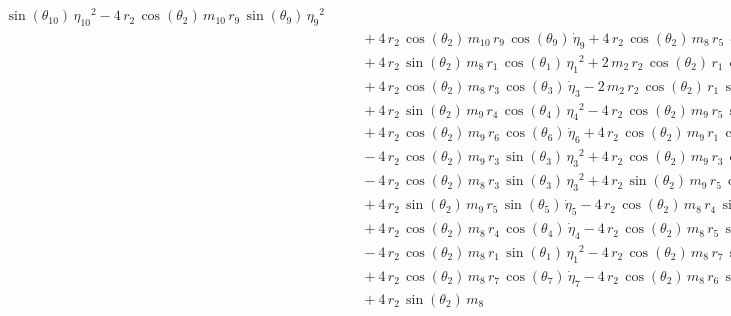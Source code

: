 \begin{eqnarray*}
\sin({\theta_{10}})\,{{\eta_{10}}}^2 - 4\,r_{2}\,\cos({\theta_{2}})\,m
_{10}\,r_{9}\,\sin({\theta_{9}})\,{{\eta_{9}}}^2 \\ &&\quad\mbox{} + 4
\,r_{2}\,\cos({\theta_{2}})\,m_{10}\,r_{9}\,\cos({\theta_{9}})\,{
\dot{\eta}_{9}} + 4\,r_{2}\,\cos({\theta_{2}})\,m_{8}\,r_{5}\,\cos({
\theta_{5}})\,{\dot{\eta}_{5}} \\ &&\quad\mbox{} + 4\,r_{2}\,\sin({
\theta_{2}})\,m_{8}\,r_{1}\,\cos({\theta_{1}})\,{{\eta_{1}}}^2 + 2\,m
_{2}\,r_{2}\,\cos({\theta_{2}})\,r_{1}\,\cos({\theta_{1}})\,{
\dot{\eta}_{1}} \\ &&\quad\mbox{} + 4\,r_{2}\,\cos({\theta_{2}})\,m_{8
}\,r_{3}\,\cos({\theta_{3}})\,{\dot{\eta}_{3}} - 2\,m_{2}\,r_{2}\,\cos
({\theta_{2}})\,r_{1}\,\sin({\theta_{1}})\,{{\eta_{1}}}^2
 \\ &&\quad\mbox{} + 4\,r_{2}\,\sin({\theta_{2}})\,m_{9}\,r_{4}\,\cos(
{\theta_{4}})\,{{\eta_{4}}}^2 - 4\,r_{2}\,\cos({\theta_{2}})\,m_{9}\,r
_{5}\,\sin({\theta_{5}})\,{{\eta_{5}}}^2 \\ &&\quad\mbox{} + 4\,r_{2}
\,\cos({\theta_{2}})\,m_{9}\,r_{6}\,\cos({\theta_{6}})\,{\dot{\eta}_{6
}} + 4\,r_{2}\,\cos({\theta_{2}})\,m_{9}\,r_{1}\,\cos({\theta_{1}})\,{
\dot{\eta}_{1}} \\ &&\quad\mbox{} - 4\,r_{2}\,\cos({\theta_{2}})\,m_{9
}\,r_{3}\,\sin({\theta_{3}})\,{{\eta_{3}}}^2 + 4\,r_{2}\,\cos({\theta
_{2}})\,m_{9}\,r_{3}\,\cos({\theta_{3}})\,{\dot{\eta}_{3}}
 \\ &&\quad\mbox{} - 4\,r_{2}\,\cos({\theta_{2}})\,m_{8}\,r_{3}\,\sin(
{\theta_{3}})\,{{\eta_{3}}}^2 + 4\,r_{2}\,\sin({\theta_{2}})\,m_{9}\,r
_{5}\,\cos({\theta_{5}})\,{{\eta_{5}}}^2 \\ &&\quad\mbox{} + 4\,r_{2}
\,\sin({\theta_{2}})\,m_{9}\,r_{5}\,\sin({\theta_{5}})\,{\dot{\eta}_{5
}} - 4\,r_{2}\,\cos({\theta_{2}})\,m_{8}\,r_{4}\,\sin({\theta_{4}})\,{
{\eta_{4}}}^2 \\ &&\quad\mbox{} + 4\,r_{2}\,\cos({\theta_{2}})\,m_{8}
\,r_{4}\,\cos({\theta_{4}})\,{\dot{\eta}_{4}} - 4\,r_{2}\,\cos({\theta
_{2}})\,m_{8}\,r_{5}\,\sin({\theta_{5}})\,{{\eta_{5}}}^2
 \\ &&\quad\mbox{} - 4\,r_{2}\,\cos({\theta_{2}})\,m_{8}\,r_{1}\,\sin(
{\theta_{1}})\,{{\eta_{1}}}^2 - 4\,r_{2}\,\cos({\theta_{2}})\,m_{8}\,r
_{7}\,\sin({\theta_{7}})\,{{\eta_{7}}}^2 \\ &&\quad\mbox{} + 4\,r_{2}
\,\cos({\theta_{2}})\,m_{8}\,r_{7}\,\cos({\theta_{7}})\,{\dot{\eta}_{7
}} - 4\,r_{2}\,\cos({\theta_{2}})\,m_{8}\,r_{6}\,\sin({\theta_{6}})\,{
{\eta_{6}}}^2 \\ &&\quad\mbox{} + 4\,r_{2}\,\sin({\theta_{2}})\,m_{8}

\end{eqnarray*}
